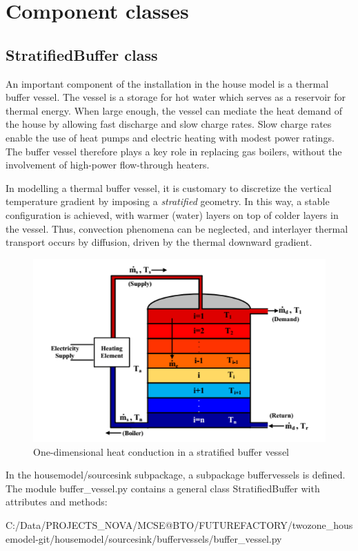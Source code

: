 \section{Component classes}

\subsection{StratifiedBuffer class}
An important component of the installation in the house model is a thermal buffer vessel. The vessel is a storage for hot water which serves as a reservoir for thermal energy. When large enough, the vessel can mediate the heat demand of the house by allowing fast discharge and slow charge rates. Slow charge rates enable the use of heat pumps and electric heating with modest power ratings. The buffer vessel therefore plays a key role in replacing gas boilers, without the involvement of high-power flow-through heaters. 

In modelling a thermal buffer vessel, it is customary to discretize the vertical temperature gradient by imposing a \emph{stratified} geometry. In this way, a stable configuration is achieved, with warmer (water) layers on top of colder layers in the vessel. Thus, convection phenomena can be neglected, and interlayer thermal transport occurs by diffusion, driven by the thermal downward gradient.

\begin{figure}[H]
	\centering
	\includegraphics[width=0.5\columnwidth]{Pictures/stratified.png}
	\caption[Short title]{One-dimensional heat conduction in a stratified buffer vessel}
	\label{fig:stratified}
\end{figure} 

In the \textsf{housemodel/sourcesink} subpackage, a subpackage \textsf{buffervessels} is defined. The module buffer\_vessel.py contains a general class \textsf{StratifiedBuffer} with attributes and methods:

 
{C:/Data/PROJECTS_NOVA/MCSE@BTO/FUTUREFACTORY/twozone_housemodel-git/housemodel/sourcesink/buffervessels/buffer_vessel.py}

